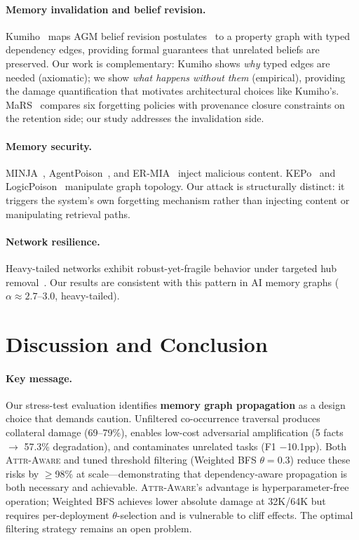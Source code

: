 \documentclass{article}
\newcommand{\attraware}{\textsc{Attr-Aware}}
\begin{document}
\paragraph{Memory invalidation and belief revision.}
Kumiho~\citep{kumiho_2026} maps AGM belief revision postulates~\citep{agm_1985} to a property graph with typed dependency edges, providing formal guarantees that unrelated beliefs are preserved.
Our work is complementary: Kumiho shows \textit{why} typed edges are needed (axiomatic); we show \textit{what happens without them} (empirical), providing the damage quantification that motivates architectural choices like Kumiho's.
MaRS~\citep{mars_2025} compares six forgetting policies with provenance closure constraints on the retention side; our study addresses the invalidation side.

\paragraph{Memory security.}
MINJA~\citep{minja_2025}, AgentPoison~\citep{agentpoison_2024}, and ER-MIA~\citep{ermia_2026} inject malicious content.
KEPo~\citep{kepo_2026} and LogicPoison~\citep{logicpoison_2026} manipulate graph topology.
Our attack is structurally distinct: it triggers the system's own forgetting mechanism rather than injecting content or manipulating retrieval paths.

\paragraph{Network resilience.}
Heavy-tailed networks exhibit robust-yet-fragile behavior under targeted hub removal~\citep{albert_attack_2000, cohen_percolation_2000}.
Our results are consistent with this pattern in AI memory graphs ($\alpha \approx 2.7$--$3.0$, heavy-tailed).


\section{Discussion and Conclusion}
\label{sec:conclusion}

\paragraph{Key message.}
Our stress-test evaluation identifies \textbf{memory graph propagation} as a design choice that demands caution.
Unfiltered co-occurrence traversal produces collateral damage (69--79\%), enables low-cost adversarial amplification (5 facts $\rightarrow$ 57.3\% degradation), and contaminates unrelated tasks (F1 $-$10.1pp).
Both \attraware{} and tuned threshold filtering (Weighted BFS $\theta{=}0.3$) reduce these risks by $\geq$98\% at scale---demonstrating that dependency-aware propagation is both necessary and achievable.
\attraware{}'s advantage is hyperparameter-free operation; Weighted BFS achieves lower absolute damage at 32K/64K but requires per-deployment $\theta$-selection and is vulnerable to cliff effects. The optimal filtering strategy remains an open problem.
\end{document}
